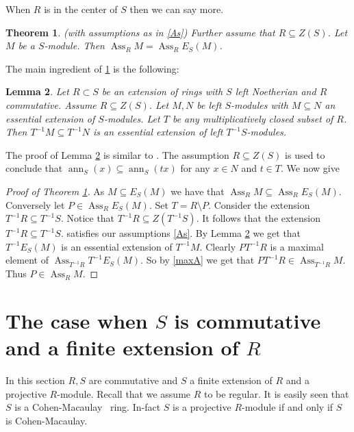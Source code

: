 \documentclass{amsart}
\theoremstyle{plain}
\newtheorem{theorem}{Theorem}[section]
\newtheorem{lemma}[theorem]{Lemma}
\theoremstyle{definition}
\theoremstyle{remark}
\numberwithin{equation}{theorem}
\begin{document}
When $R $ is in the center of $S$ then we can say more.
\begin{theorem}\label{Z}
(with assumptions as in \ref{As}) Further assume that $R \subseteq Z(S)$. Let $M$ be a $S$-module. Then ${\operatorname{Ass}}_R M = {\operatorname{Ass}}_R E_S(M)$.
\end{theorem}
The main ingredient of \ref{Z} is the following:
\begin{lemma}\label{essT}
Let $R \subset S$ be an extension of rings with $S$ left Noetherian and $R$ commutative. Assume $R \subseteq Z(S)$.
Let $M, N$ be left $S$-modules with $M \subseteq N$ an essential extension of $S$-modules. Let $T$ be any multiplicatively closed subset of $R$. Then
$T^{-1}M \subseteq T^{-1}N$ is an essential extension of left $T^{-1}S$-modules.
\end{lemma}
The proof of Lemma \ref{essT} is similar to \cite[3.2.5]{BH}. The assumption $R \subseteq Z(S)$ is used to conclude that ${\operatorname{ann}}_S(x) \subseteq {\operatorname{ann}}_S(tx)$ for
any $x \in N$ and $t \in T$. We now give
\begin{proof}[Proof of Theorem \ref{Z}]
As $M \subseteq E_S(M)$ we have that ${\operatorname{Ass}}_R M \subseteq {\operatorname{Ass}}_R E_S(M)$. Conversely let $P \in {\operatorname{Ass}}_R E_S(M)$. Set $T = R\setminus P$. Consider the extension $T^{-1}R \subseteq T^{-1}S$. Notice that $T^{-1}R \subseteq Z(T^{-1}S)$. It follows that the extension $T^{-1}R \subseteq T^{-1}S$.
satisfies our assumptions \ref{As}. By Lemma \ref{essT} we get that $T^{-1}E_S(M)$ is an essential extension of $T^{-1}M$. Clearly $PT^{-1}R$ is a maximal element of ${\operatorname{Ass}}_{T^{-1}R}T^{-1}E_S(M)$. So by \ref{maxA} we get that $PT^{-1}R \in {\operatorname{Ass}}_{T^{-1}R} M$. Thus $P \in {\operatorname{Ass}}_R M$.
\end{proof}
\section{The case when $S$ is commutative and a finite extension of $R$}
In this section  $R, S$ are commutative and $S$ a finite extension of $R$ and a projective $R$-module. Recall that we assume $R$ to be regular.
It is easily seen that   $S$ is a {Cohen-Macaulay} \ ring. In-fact $S$ is a projective $R$-module if and only if $S$ is {Cohen-Macaulay}.
\end{document}
